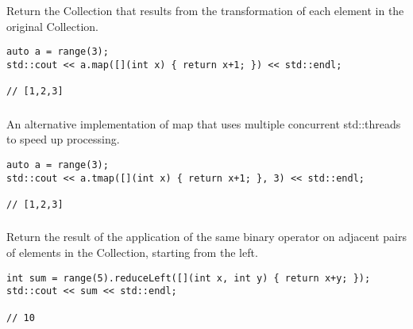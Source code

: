 \subsubsection{}

Return the Collection that results from the transformation of each element in the original Collection.

\begin{lstlisting}[title=example]
auto a = range(3);
std::cout << a.map([](int x) { return x+1; }) << std::endl;

// [1,2,3]
\end{lstlisting}




\subsubsection{}

An alternative implementation of map that uses multiple concurrent
std::threads to speed up processing.

\begin{lstlisting}[title=example]
auto a = range(3);
std::cout << a.tmap([](int x) { return x+1; }, 3) << std::endl;

// [1,2,3]
\end{lstlisting}





\subsubsection{}

Return the result of the application of the same binary operator on adjacent pairs of elements in the Collection, starting from the left.

\begin{lstlisting}[title=example]
int sum = range(5).reduceLeft([](int x, int y) { return x+y; });
std::cout << sum << std::endl;

// 10
\end{lstlisting}




\subsubsection{}

